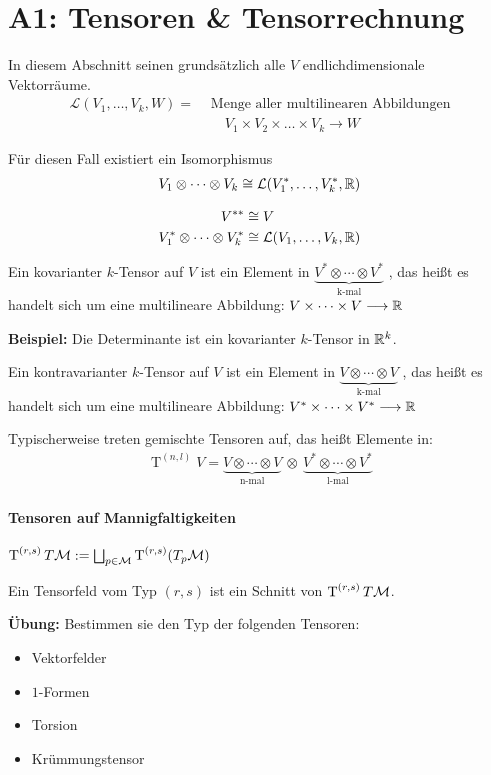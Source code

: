 \chapter*{A1: Tensoren \& Tensorrechnung}
In diesem Abschnitt seinen grundsätzlich alle $V$ endlichdimensionale Vektorräume. \\
\begin{align*}
\mathcal{L}(V_1,\dots, V_k, W) = &\text{ Menge aller multilinearen Abbildungen} \\
&\phantom{ = } V_1 \times V_2 \times \dots \times V_k \longrightarrow W
\end{align*}

\begin{satz}
Für diesen Fall existiert ein Isomorphismus
\begin{align*}
V_1 \otimes \cdots \otimes V_k \cong \mathcal{L}(V_1^*, \dots, V_k^*, \mathbb{R})
\end{align*}
\end{satz}

\begin{bem}
\begin{align*}
V^{**} &\cong V \\
V_1^* \otimes \cdots \otimes V_k^* &\cong \mathcal{L}(V_1, \dots, V_k, \mathbb{R})
\end{align*}
\end{bem}

\begin{defs}
Ein kovarianter $k$-Tensor auf $V$ ist ein Element in $\underbrace{V^*\otimes\cdots\otimes V^*}_{\text{k-mal}}$ , das heißt es handelt sich um eine multilineare Abbildung: $ V \times \cdots \times V \longrightarrow \mathbb{R}$
\end{defs}
\textbf{Beispiel:} Die Determinante ist ein kovarianter $k$-Tensor in $\mathbb{R}^k$.
\begin{defs}
Ein kontravarianter $k$-Tensor auf $V$ ist ein Element in $\underbrace{V\otimes\cdots\otimes V}_{\text{k-mal}}$ , das heißt es handelt sich um eine multilineare Abbildung: $ V^*\times \cdots \times V^* \longrightarrow \mathbb{R}$
\end{defs}
Typischerweise treten gemischte Tensoren auf, das heißt Elemente in:
\begin{align*}
\operatorname{T}^{(n, l)}V = \underbrace{V\otimes\cdots\otimes V}_{\text{n-mal}} \ \otimes \  \underbrace{V^*\otimes\cdots\otimes V^*}_{\text{l-mal}}
\end{align*}

\subsubsection*{Tensoren auf Mannigfaltigkeiten}
$\operatorname{T}^{(r, s)}T\mathcal{M}  := \bigsqcup_{p\in\mathcal{M}} \operatorname{T}^{(r, s)}(T_p\mathcal{M})$

\begin{defs}
Ein Tensorfeld vom Typ $(r,s)$ ist ein Schnitt von $\operatorname{T}^{(r, s)}T\mathcal{M}$.
\end{defs}

\textbf{Übung:} Bestimmen sie den Typ der folgenden Tensoren:
\begin{itemize}
\item Vektorfelder
\item $1$-Formen
\item Torsion
\item Krümmungstensor
\end{itemize}
